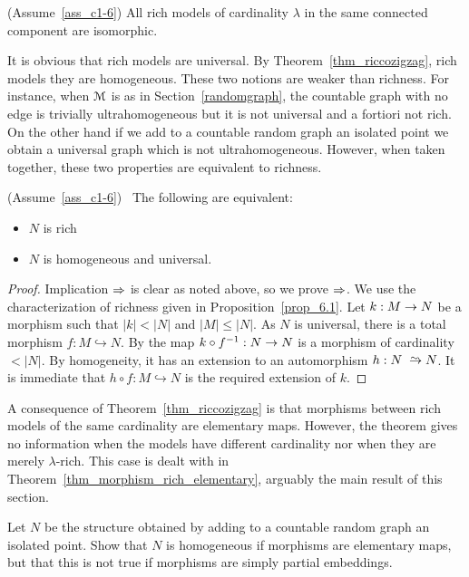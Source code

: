 \begin{corollary}\label{coroll_riccozigzag}
(Assume~\ref{ass_c1-6})  All rich models of cardinality $\lambda$ in the same connected component are isomorphic.
\end{corollary}

It is obvious that rich models are universal.
By Theorem~\ref{thm_riccozigzag}, rich models they are ho\-mo\-ge\-ne\-ous.
These two notions are weaker than richness.
For instance, when $\EuScript M$ is as in Section~\ref{randomgraph}, the countable graph with no edge is trivially ultrahomogeneous but it is not universal and a fortiori not rich.
On the other hand if we add to a countable random graph an isolated point we obtain a universal graph which is not ultrahomogeneous.
However, when taken together, these two properties are equivalent to richness.

\begin{theorem}\label{ricco<->universaleomogeneo}
(Assume~\ref{ass_c1-6}) \ The following are equivalent:
\begin{itemize}
\item[1.] $N$ is rich
\item[2.] $N$ is homogeneous and universal.
\end{itemize}
\end{theorem}
\begin{proof} 
Implication $\Rightarrow$ is clear as noted above, so we prove $\Rightarrow$.
We use the characterization of richness given in Proposition~\ref{prop_6.1}.
Let $k:M\rightarrow N$ be a morphism such that $|k|<|N|$ and $|M|\le|N|$.
As $N$ is universal, there is a total morphism \hbox{$f:M\hookrightarrow N$}.
By  the map $k\circ f^{-1}:N\rightarrow N$ is a morphism of cardinality $<|N|$.
By homogeneity, it has an extension to an automorphism $h:N\isomap N$.
It is immediate that $h\circ f:M\hookrightarrow N$ is the required extension of $k$.
\end{proof}

A consequence of Theorem~\ref{thm_riccozigzag} is that morphisms between rich models of the same cardinality are elementary maps.
However, the theorem gives no information when the models have different cardinality nor when they are merely $\lambda$-rich.
This case is dealt with in Theorem~\ref{thm_morphism_rich_elementary}, arguably the main result of this section.

\begin{exercise}
Let $N$ be the structure obtained by adding to a countable random graph an isolated point.
Show that $N$ is homogeneous if morphisms are elementary maps, but that this is not true if morphisms are simply partial embeddings.
\end{exercise}

